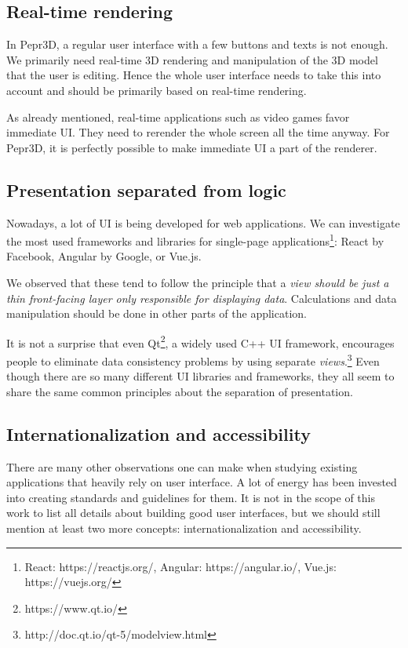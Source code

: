\subsection{Real-time rendering}

In Pepr3D, a regular user interface with a few buttons and texts is not enough.
We primarily need real-time 3D rendering and manipulation of the 3D model that the user is editing.
Hence the whole user interface needs to take this into account and should be primarily based on real-time rendering.

As already mentioned, real-time applications such as video games favor immediate UI.
They need to rerender the whole screen all the time anyway.
For Pepr3D, it is perfectly possible to make immediate UI a part of the renderer.

\subsection{Presentation separated from logic}

Nowadays, a lot of UI is being developed for web applications.
We can investigate the most used frameworks and libraries for single-page applications\footnote{React: https://reactjs.org/, Angular: https://angular.io/, Vue.js: https://vuejs.org/}: React by Facebook, Angular by Google, or Vue.js.

We observed that these tend to follow the principle that a \emph{view should be just a thin front-facing layer only responsible for displaying data}.
Calculations and data manipulation should be done in other parts of the application.

It is not a surprise that even Qt\footnote{https://www.qt.io/}, a widely used C++ UI framework, encourages people to eliminate data consistency problems by using separate \emph{views}.\footnote{http://doc.qt.io/qt-5/modelview.html}
Even though there are so many different UI libraries and frameworks, they all seem to share the same common principles about the separation of presentation.

\subsection{Internationalization and accessibility}

There are many other observations one can make when studying existing applications that heavily rely on user interface.
A lot of energy has been invested into creating standards and guidelines for them.
It is not in the scope of this work to list all details about building good user interfaces, but we should still mention at least two more concepts: internationalization and accessibility.


